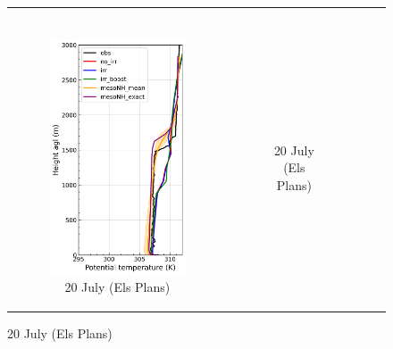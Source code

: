 \begin{figure}[hbtp]
{\begin{tabular}{@{}cccc@{}}
\begin{subfigure}[t]{0.283\textwidth}
        \end{subfigure} \\
        \begin{subfigure}[t]{0.382\textwidth}
            \caption{20 July (Els Plans)}
            \includegraphics[width=\textwidth]{images/chap5/profiles/profile_elsplans_theta_2007_.png}
        \end{subfigure} &
        \begin{subfigure}[t]{0.289\textwidth}
            \caption{20 July (Els Plans)}

\end{subfigure}
\end{tabular}}
\end{figure}
